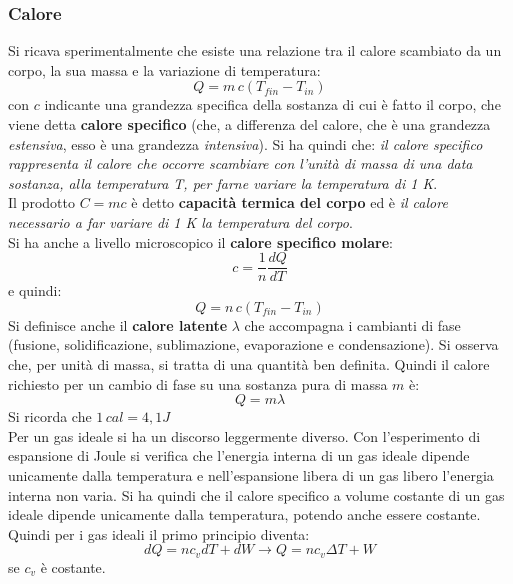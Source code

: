 \documentclass[a4paper,12pt, oneside]{book}
\begin{document}
\subsubsection{Calore}
Si ricava sperimentalmente che esiste una relazione tra il calore scambiato da un corpo, la sua massa e la variazione di temperatura:
$$Q=m\,c(T_{fin}-T_{in})$$
con $c$ indicante una grandezza specifica della sostanza di cui è fatto il corpo, che viene detta \textbf{calore specifico} (che, a differenza del calore, che è una grandezza \textit{estensiva}, esso è una grandezza \textit{intensiva}). Si ha quindi che: \textit{il calore specifico rappresenta il calore che occorre scambiare con l'unità di massa di una data sostanza, alla temperatura T, per farne variare la temperatura di 1 K}.\\
Il prodotto $C=mc$ è detto \textbf{capacità termica del corpo} ed è \textit{il calore necessario a far variare di 1 K la temperatura del corpo}.\\
Si ha anche a livello microscopico il \textbf{calore specifico molare}:
$$c=\frac{1}{n}\frac{dQ}{dT}$$
e quindi:
$$Q=n\,c(T_{fin}-T_{in})$$
Si definisce anche il \textbf{calore latente} $\lambda$ che accompagna i cambianti di fase (fusione, solidificazione, sublimazione, evaporazione e condensazione). Si osserva che, per unità di massa, si tratta di una quantità ben definita. Quindi il calore richiesto per un cambio di fase su una sostanza pura di massa $m$ è:
$$Q=m\lambda$$
Si ricorda che $1\,cal=4,1J$
\\
Per un gas ideale si ha un discorso leggermente diverso. Con l'esperimento di espansione di Joule si verifica che l'energia interna di un gas ideale dipende unicamente dalla temperatura e nell'espansione libera di un gas libero l'energia interna non varia. Si ha quindi che il calore specifico a volume costante di un gas ideale dipende unicamente dalla temperatura, potendo anche essere costante. Quindi per i gas ideali il primo principio diventa:
$$dQ=nc_vdT+dW\longrightarrow Q=nc_v\Delta T+W$$
se $c_v$ è costante.
\end{document}
